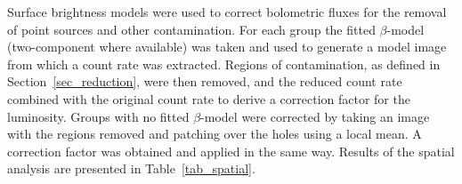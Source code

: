 \documentclass[usenatbib]{mn2e}
\begin{document}
Surface brightness models were used to correct bolometric fluxes for the removal
of point sources and other contamination.  For each group the fitted
$\beta$-model (two-component where available) was taken and used to generate a
model image from which a count rate was extracted.  Regions of contamination, as
defined in Section~\ref{sec_reduction}, were then removed, and the reduced count
rate combined with the original count rate to derive a correction factor for the
luminosity.  Groups with no fitted $\beta$-model were corrected by taking an
image with the regions removed and patching over the holes using a local mean.  A
correction factor was obtained and applied in the same way.  Results of the
spatial analysis are presented in Table~\ref{tab_spatial}.


\end{document}
